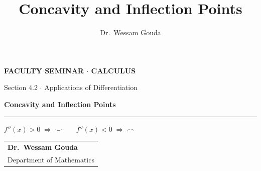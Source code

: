 \documentclass[aspectratio=169,11pt]{beamer}
\title{Concavity and Inflection Points}
\author{Dr.\ Wessam Gouda}
\date{}
\begin{document}
{
\begin{frame}[plain]
  \centering\vspace*{0.9cm}
  {\color{gold}\small\bfseries FACULTY SEMINAR \;$\cdot$\; CALCULUS}\par\vspace{0.3cm}
  {\color{muted}\large Section 4.2 \;$\cdot$\; Applications of Differentiation}\par\vspace{0.15cm}
  {\fontsize{28}{34}\selectfont\bfseries Concavity and Inflection Points}\par\vspace{0.25cm}
  {\color{gold}\rule{6cm}{1.2pt}}\par\vspace{0.3cm}
  {\Large$f''(x)>0\;\Rightarrow\;\smile\qquad f''(x)<0\;\Rightarrow\;\frown$}\par
  \vfill
  \begin{flushleft}\hspace{0.25cm}%
  \begin{tabular}[b]{@{}l@{}}{\bfseries Dr.\ Wessam Gouda}\\{\color{muted}\scriptsize Department of Mathematics}\end{tabular}
  \end{flushleft}\vspace*{0.2cm}
\end{frame}}
\end{document}
